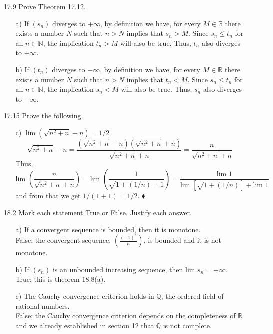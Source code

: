\documentclass[12pt]{article}
\begin{document}
\begin{enumerate}
\begin{enumerate}
\item[17.9] Prove Theorem 17.12.
\begin{enumerate}
\item[a)] If $(s_n)$ diverges to $+\infty$, by definition we have, 
for every $M \in \mathbb{R}$ there exists a number $N$ such that
$n > N$ implies that $s_n > M$. Since $s_n \leq t_n$ for all $n \in \mathbb{N}$, 
the implication $t_n > M$ will also be true. Thus, $t_n$ also diverges to
$+\infty$.
\item[b)] If $(t_n)$ diverges to $-\infty$, by definition we have, 
for every $M \in \mathbb{R}$ there exists a number $N$ such that
$n > N$ implies that $t_n < M$. Since $s_n \leq t_n$ for all $n \in \mathbb{N}$, 
the implication $s_n < M$ will also be true. Thus, $s_n$ also diverges to
$-\infty$.
\end{enumerate}

\item[17.15] Prove the following.
\begin{enumerate}
\item[c)] $\lim (\sqrt{n^2 + n} - n) = 1/2$
\[
\sqrt{n^2 + n} - n = \frac{(\sqrt{n^2 + n} - n)(\sqrt{n^2 + n} + n)}{\sqrt{n^2 + n} + n}
= \frac{n}{\sqrt{n^2 + n} + n}
\]
Thus,
\[
\mbox{lim }\left( \frac{n}{\sqrt{n^2 + n} + n} \right) = 
\mbox{lim }\left( \frac{1}{\sqrt{1 + (1/n)} + 1} \right) =
\frac{\mbox{lim }1}{\mbox{lim } [\sqrt{1 + (1/n)}] + \mbox{lim } 1}
\]
and from that we get $1/(1 + 1) = 1/2$. \hskip 7.2cm $\blacklozenge$ 
\end{enumerate}

\item[18.2] Mark each statement True or False. Justify each answer.
\begin{enumerate}
\item[a)] If a convergent sequence is bounded, then it is monotone. \\
False; the convergent sequence, {\large $\left( \frac{(-1)^n}{n} \right)$},
is bounded and it is not monotone.
\item[b)] If $(s_n)$ is an unbounded increasing sequence, then lim $s_n = +\infty$. \\
True; this is theorem 18.8(a).
\item[c)] The Cauchy convergence criterion holds in $\mathbb{Q}$, the ordered field of rational numbers. \\
False; the Cauchy convergence criterion depends on the completeness of $\mathbb{R}$
and we already established in section 12 that $\mathbb{Q}$ is not complete.
\end{enumerate}


\end{enumerate}
\end{enumerate}
\end{document}
